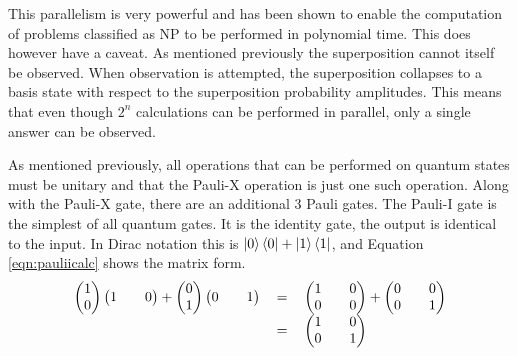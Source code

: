 This parallelism is very powerful and has been shown to enable the computation of problems classified as NP to be performed in polynomial time.
This does however have a caveat.
As mentioned previously the superposition cannot itself be observed.
When observation is attempted, the superposition collapses to a basis state with respect to the superposition probability amplitudes.
This means that even though $2^n$ calculations can be performed in parallel, only a single answer can be observed.

As mentioned previously, all operations that can be performed on quantum states must be unitary and that the Pauli-X operation is just one such operation.
Along with the Pauli-X gate, there are an additional 3 Pauli gates.
The Pauli-I gate is the simplest of all quantum gates.
It is the identity gate, the output is identical to the input.
In Dirac notation this is $\left\vert{0}\right\rangle\left\langle{0}\right\vert + \left\vert{1}\right\rangle\left\langle{1}\right\vert$, and Equation \ref{eqn:pauliicalc} shows the matrix form. 
\begin{equation}
\label{eqn:pauliicalc}
\begin{tabular}{ r c l }
\(\begin {pmatrix}
1\\
0
\end{pmatrix}
\begin {pmatrix}
1&&
0
\end{pmatrix}
 + 
\begin {pmatrix}
0\\
1
\end{pmatrix}
\begin {pmatrix}
0&&
1
\end{pmatrix}\)
& \(=\)
& \( 
\begin{pmatrix}
1 && 0 \\
0 && 0
\end{pmatrix}
 + 
\begin{pmatrix}
0 && 0\\
0 && 1
\end{pmatrix}
\) \\
& \(=\)
& \( 
\begin{pmatrix}
1 && 0 \\
0 && 1
\end{pmatrix}
\)
\end{tabular}
\end{equation}


